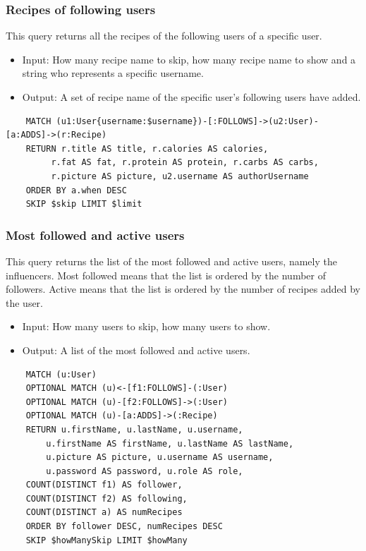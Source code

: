 \documentclass[a4paper]{report}
\begin{document}
\subsubsection{Recipes of following users}
This query returns all the recipes of the following users of a specific user.
\begin{itemize}
	\item Input: How many recipe name to skip, how many recipe name to show and a string who represents a specific username.
	\item Output: A set of recipe name of the specific user's following users have added.
\end{itemize}
\lstset{ language=java}
\begin{lstlisting}
	MATCH (u1:User{username:$username})-[:FOLLOWS]->(u2:User)-[a:ADDS]->(r:Recipe)
	RETURN r.title AS title, r.calories AS calories,
		 r.fat AS fat, r.protein AS protein, r.carbs AS carbs,
		 r.picture AS picture, u2.username AS authorUsername 
	ORDER BY a.when DESC 
	SKIP $skip LIMIT $limit
\end{lstlisting}
\subsubsection{Most followed and active users}
This query returns the list of the most followed and active users, namely the influencers.
Most followed means that the list is ordered by the number of followers.
Active means that the list is ordered by the number of recipes added by the user.
\begin{itemize}
	\item Input: How many users to skip, how many users to show.
	\item Output: A list of the most followed and active users.
\end{itemize}
\lstset{ language=java}
\begin{lstlisting}
	MATCH (u:User)
	OPTIONAL MATCH (u)<-[f1:FOLLOWS]-(:User)
	OPTIONAL MATCH (u)-[f2:FOLLOWS]->(:User)
	OPTIONAL MATCH (u)-[a:ADDS]->(:Recipe)
	RETURN u.firstName, u.lastName, u.username, 
		u.firstName AS firstName, u.lastName AS lastName, 
		u.picture AS picture, u.username AS username,
		u.password AS password, u.role AS role,
	COUNT(DISTINCT f1) AS follower,
	COUNT(DISTINCT f2) AS following,
	COUNT(DISTINCT a) AS numRecipes
	ORDER BY follower DESC, numRecipes DESC
	SKIP $howManySkip LIMIT $howMany
\end{lstlisting}
\end{document}
